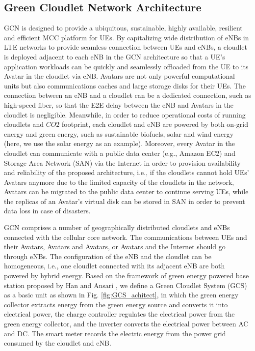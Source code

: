\documentclass[journal,12pt,draftclsnofoot,onecolumn]{IEEEtran}
\begin{document}
\subsection{Green Cloudlet Network Architecture}
GCN is designed to provide a ubiquitous, sustainable, highly available, resilient and efficient MCC platform for UEs. By capitalizing wide distribution of eNBs in LTE networks to provide seamless connection between UEs and eNBs, a cloudlet is deployed adjacent to each eNB in the GCN architecture so that a UE's application workloads can be quickly and seamlessly offloaded from the UE to its Avatar in the cloudlet via eNB. Avatars are not only powerful computational units but also communications caches and large storage disks for their UEs. The connection between an eNB and a cloudlet can be a dedicated connection, such as high-speed fiber, so that the E2E delay between the eNB and Avatars in the cloudlet is negligible. Meanwhile, in order to reduce operational costs of running cloudlets and $CO2$ footprint, each cloudlet and eNB are powered by both on-grid energy and green energy, such as sustainable biofuels, solar and wind energy (here, we use the solar energy as an example). Moreover, every Avatar in the cloudlet can communicate with a public data center (e.g., Amazon EC2) and Storage Area Network (SAN) via the Internet in order to provision availability and reliability of the proposed architecture, i.e., if the cloudlets cannot hold UEs' Avatars anymore due to the limited capacity of the cloudlets in the network, Avatars can be migrated to the public data center to continue serving UEs, while the replicas of an Avatar's virtual disk can be stored in SAN in order to prevent data loss in case of disasters.

GCN comprises a number of geographically distributed cloudlets and eNBs connected with the cellular core network. The communications between UEs and their Avatars, Avatars and Avatars, or Avatars and the Internet should go through eNBs. The configuration of the eNB and the cloudlet can be homogeneous, i.e., one cloudlet connected with its adjacent eNB are both powered by hybrid energy. Based on the framework of green energy powered base station proposed by Han and Ansari \cite{4}, we define a Green Cloudlet System (GCS) as a basic unit as shown in Fig. \ref{fig:GCS_achitect}, in which the green energy collector extracts energy from the green energy source and converts it into electrical power, the charge controller regulates the electrical power from the green energy collector, and the inverter converts the electrical power between AC and DC. The smart meter records the electric energy from the power grid consumed by the cloudlet and eNB.
\end{document}
